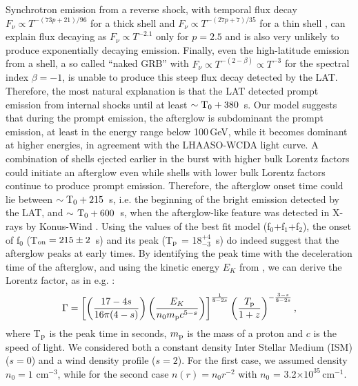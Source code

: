 \documentclass[preprint]{aastex631}
\begin{document}
Synchrotron emission from a reverse shock, with temporal flux decay $F_\nu \propto T^{-(73p+21)/96}$ for a thick shell and $F_\nu \propto T^{-(27p+7)/35}$ for a thin shell \citep{2000ApJ...545..807K}, can explain flux decaying as $F_\nu\propto T^{-2.1}$ only for $p = 2.5$ and is also very unlikely to produce exponentially decaying emission. Finally, even the high-latitude emission from a shell, a so called ``naked GRB'' \citep{2000ApJ...541L..51K} with $F_\nu\propto T^{-(2-\beta)} \propto T^{-3}$ for the spectral index $\beta = -1$, is unable to produce this steep flux decay detected by the LAT. 
Therefore, the most natural explanation is that the LAT detected prompt emission from internal shocks until at least $\sim \rm{T}_0 + 380$~s. 
Our model suggests that during the prompt emission, the afterglow is subdominant the prompt emission, at least in the energy range below 100\,GeV, while it becomes dominant at higher energies, in agreement with the LHAASO-WCDA light curve.
A combination of shells ejected earlier in the burst with higher bulk Lorentz factors could initiate an afterglow even while shells with lower bulk Lorentz factors continue to produce prompt emission. 
Therefore, the afterglow onset time could lie between $\sim \rm{T}_0 + 215$~s, i.e. the beginning of the bright emission detected by the LAT, and $\sim$  $\rm{T}_0 + 600$~s, when the afterglow-like feature was detected in X-rays by Konus-Wind \citep{BOAT_KW}. 
Using the values of the best fit model (f$_{0}$+f$_{1}$+f$_{2}$), the onset of f$_{0}$ (T$_{\rm on} = 215 \pm 2$~s) and its peak (T$_{\rm p}$ = 18$^{+4}_{-3}$~s) do indeed suggest that the afterglow peaks at early times.
By identifying the peak time with the deceleration time of the afterglow, and using the kinetic energy ${E_K}$ from \citet{2023ApJ...952L..42L}, we can derive the Lorentz factor, as in e.g. \citet{GammaNappo,Ghirlanda+18Lorentz}:
%
\begin{equation}\label{eq:N14}
\Gamma 
= \left[\left(\frac{17-4s}{16\pi(4-s)}\right)
\left(\frac{E_K}{n_0 m_{\rm p}c^{5-s}}\right)\right]^{\frac{1}{8-2s}}\left(\fraz{T_{\rm p}}{1+z}\right)^{-\frac{3-s}{8-2s}},
\end{equation}
%
where T$_{\rm p}$ is the peak time in seconds, $m_{\rm p}$ is the mass of a proton and $c$ is the speed of light. We considered both a constant density Inter Stellar Medium (ISM) ($s=0$) and a wind density profile ($s=2$). For the first case,  we assumed density $n_{0}=1$ cm$^{-3}$, while for the second case $n(r)=n_{0}r^{-2}$ with $n_{0}$ = 3.2$\times 10^{35}$\,cm$^{-1}$. 
\end{document}
